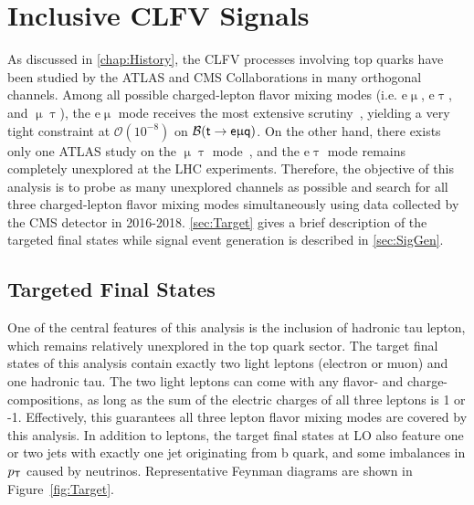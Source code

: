 \chapter{Inclusive CLFV Signals}
\label{chap:Signal}

As discussed in \autoref{chap:History}, the \ac{CLFV} processes involving top quarks have been studied by the \ac{ATLAS} and \ac{CMS} Collaborations in many orthogonal channels. Among all possible charged-lepton flavor mixing modes (i.e. e$\upmu$, e$\uptau$, and $\upmu\uptau$), the e$\upmu$ mode receives the most extensive scrutiny~\cite{ATLAS-CONF-2018-044,CMS:2022ztx,CMS:2023phe}, yielding a very tight constraint at $\mathcal{O}(10^{-8})$ on $\mathcal{B}(\textsf{t}\rightarrow\textsf{e}\upmu\textsf{q})$. On the other hand, there exists only one \ac{ATLAS} study on the $\upmu\uptau$ mode~\cite{ATLAS-CONF-2023-001}, and the e$\uptau$ mode remains completely unexplored at the \ac{LHC} experiments. Therefore, the objective of this analysis is to probe as many unexplored channels as possible and search for all three charged-lepton flavor mixing modes simultaneously using data collected by the \ac{CMS} detector in 2016-2018. \autoref{sec:Target} gives a brief description of the targeted final states while signal event generation is described in \autoref{sec:SigGen}.
\section{Targeted Final States}
\label{sec:Target}

One of the central features of this analysis is the inclusion of hadronic tau lepton, which remains relatively unexplored in the top quark sector. The target final states of this analysis contain exactly two light leptons (electron or muon) and one hadronic tau. The two light leptons can come with any flavor- and charge-compositions, as long as the sum of the electric charges of all three leptons is 1 or -1. Effectively, this guarantees all three lepton flavor mixing modes are covered by this analysis. In addition to leptons, the target final states at \ac{LO} also feature one or two jets with exactly one jet originating from b quark, and some imbalances in $p_{\textsf{T}}$ caused by neutrinos. Representative Feynman diagrams are shown in Figure~\ref{fig:Target}.

